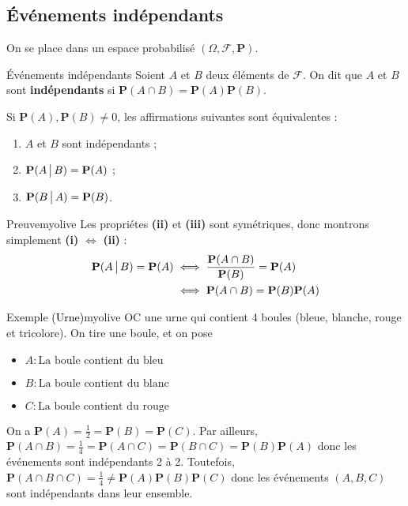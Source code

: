     \subsection{Événements indépendants}

    On se place dans un espace probabilisé $(\Omega, \mathcal{F}, \mathbf{P})$.

    \begin{defi}{Événements indépendants}{}
        Soient $A$ et $B$ deux éléments de $\mathcal{F}$. On dit que $A$ et $B$ sont \textbf{indépendants} si $\mathbf{P}(A \cap B) = \mathbf{P}(A) \mathbf{P}(B)$.
    \end{defi}

    \begin{prop}{}{}
        Si $\mathbf{P}(A), \mathbf{P}(B) \neq 0$, les affirmations suivantes sont équivalentes : 
        \begin{enumerate}
            \item $A$ et $B$ sont indépendants ;
            \item $\mathbf{P}(A \, \big| \, B) = \mathbf{P}(A)$ ;
            \item $\mathbf{P}(B \, \big| \, A) = \mathbf{P}(B)$.
        \end{enumerate}
    \end{prop}

    \begin{demo}{Preuve}{myolive}
        Les propriétes \textbf{(ii)} et \textbf{(iii)} sont symétriques, donc montrons simplement \textbf{(i)} $\iff$ \textbf{(ii)} :
        \begin{align*}
            \mathbf{P}(A \, \big| \, B) = \mathbf{P}(A) 
            &\iff \frac{\mathbf{P}(A \cap B)}{\mathbf{P}(B)} = \mathbf{P}(A) \\
            &\iff \mathbf{P}(A \cap B) = \mathbf{P}(B) \mathbf{P}(A)
        \end{align*}
    \end{demo}

    \begin{omed}{Exemple \textcolor{black}{(Urne)}}{myolive}
        OC une urne qui contient 4 boules (bleue, blanche, rouge et tricolore). On tire une boule, et on pose \begin{itemize}
            \item $A : \text{La boule contient du bleu}$
            \item $B : \text{La boule contient du blanc}$
            \item $C : \text{La boule contient du rouge}$
        \end{itemize}
        On a $\mathbf{P}(A) = \frac{1}{2} = \mathbf{P}(B) = \mathbf{P}(C)$. Par ailleurs, $\mathbf{P}(A \cap B) = \frac{1}{4} = \mathbf{P}(A \cap C) = \mathbf{P}(B \cap C) = \mathbf{P}(B)\mathbf{P}(A)$ donc les événements sont indépendants 2 à 2. Toutefois, $\mathbf{P}(A \cap B \cap C) = \frac{1}{4} \neq \mathbf{P}(A) \mathbf{P}(B) \mathbf{P}(C)$ donc les événements $(A,B,C)$ sont indépendants dans leur ensemble.
    \end{omed}

